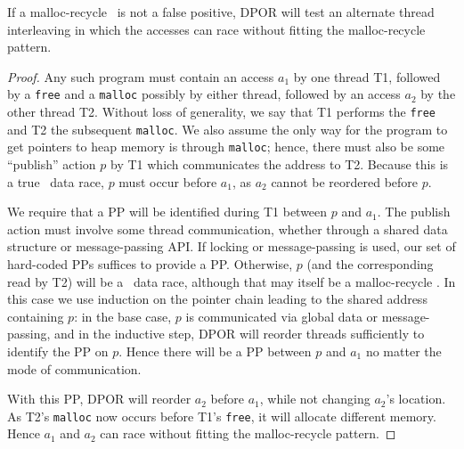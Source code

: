 \begin{theorem}
	If a malloc-recycle ~is not a false positive,
DPOR will test an alternate thread interleaving in which
the accesses can race without fitting the malloc-recycle pattern.
\end{theorem}

\begin{proof}
Any such program must contain an access $a_1$ by one thread T1,
followed by a {\tt free} and a {\tt malloc} possibly by either thread,
followed by an access $a_2$ by the other thread T2. %
Without loss of generality, we say that T1 performs the {\tt free} and T2 the subsequent {\tt malloc}. %
We also assume the only way for the program to get pointers to heap memory is through {\tt malloc};
hence, there must also be some ``publish'' action $p$ by T1 which communicates the address to T2.
Because this is a true ~data race, $p$ must occur before $a_1$, as $a_2$ cannot be reordered before $p$.

We require that a PP will be identified during T1 between $p$ and $a_1$.
The publish action must involve some thread communication, whether through a shared data structure or message-passing API.
If locking or message-passing is used, our set of hard-coded PPs suffices to provide a PP.
	Otherwise, $p$ (and the corresponding read by T2) will be a ~data race, although that may itself be a malloc-recycle .
In this case we use induction on the pointer chain leading to the shared address containing $p$:
in the base case, $p$ is communicated via global data or message-passing,
and in the inductive step, DPOR will reorder threads sufficiently to identify the PP on $p$.
Hence there will be a PP between $p$ and $a_1$ no matter the mode of communication.

With this PP, DPOR will reorder $a_2$ before $a_1$, while not changing $a_2$'s location.
As T2's {\tt malloc} now occurs before T1's {\tt free}, it will allocate different memory.
Hence $a_1$ and $a_2$ %
can race without fitting the malloc-recycle pattern.
\end{proof}
\renewcommand\proofname{Proof}



